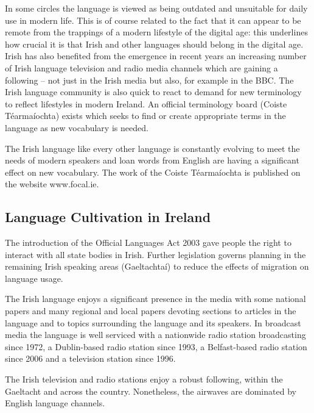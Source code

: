 \begin{multicols}{2}
In some circles the language is viewed as being outdated and unsuitable for daily use in modern life. This is of course related to the fact that it can appear to be remote from the trappings of a modern lifestyle of the digital age: this underlines how crucial it is that Irish and other languages should belong in the digital age. Irish has also benefited from the emergence in recent years an increasing number of Irish language television and radio media channels which are gaining a following -- not just in the Irish media but also, for example in the BBC. The Irish language community is also quick to react to demand for new terminology to reflect lifestyles in modern Ireland. An official terminology board (Coiste Téarmaíochta) exists which seeks to find or create appropriate terms in the language as new vocabulary is needed.


The Irish language like every other language is constantly evolving to meet the needs of modern speakers and loan words from English are having a significant effect on new vocabulary. The work of the Coiste Téarmaíochta is published on the website www.focal.ie.


\subsection{Language Cultivation in Ireland}

The introduction of the Official Languages Act 2003 gave people the right to interact with all state bodies in Irish. Further legislation governs planning in the remaining Irish speaking areas (Gaeltachtaí) to reduce the effects of migration on language usage.

The Irish language enjoys a significant presence in the media with some national papers and many regional and local papers devoting sections to articles in the language and to topics surrounding the language and its speakers. In broadcast media the language is well serviced with a nationwide radio station broadcasting since 1972, a Dublin-based radio station since 1993, a Belfast-based radio station since 2006 and a television station since 1996. 


The Irish television and radio stations enjoy a robust following, within the Gaeltacht and across the country. Nonetheless, the airwaves are dominated by English language channels.



\end{multicols}
